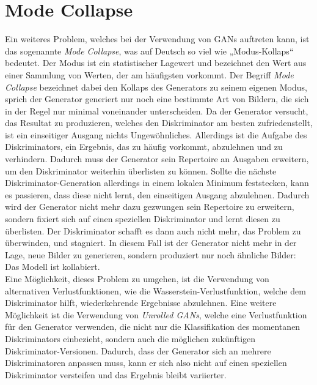 \section{Mode Collapse}

\noindent Ein weiteres Problem, welches bei der Verwendung von \acp{GAN} auftreten kann, ist das sogenannte \textit{Mode Collapse}, was auf Deutsch so viel wie „Modus-Kollaps“ bedeutet. Der Modus ist ein statistischer Lagewert und bezeichnet den Wert aus einer Sammlung von Werten, der am häufigsten vorkommt. Der Begriff \textit{Mode Collapse} bezeichnet dabei den Kollaps des Generators zu seinem eigenen Modus, sprich der Generator generiert nur noch eine bestimmte Art von Bildern, die sich in der Regel nur minimal voneinander unterscheiden.  Da der Generator versucht, das Resultat zu produzieren, welches den Diskriminator am besten zufriedenstellt, ist ein einseitiger Ausgang nichts Ungewöhnliches. Allerdings ist die Aufgabe des Diskriminators, ein Ergebnis, das zu häufig vorkommt, abzulehnen und zu verhindern. Dadurch muss der Generator sein Repertoire an Ausgaben erweitern, um den Diskriminator weiterhin überlisten zu können. Sollte die nächste Diskriminator-Generation allerdings in einem lokalen Minimum feststecken, kann es passieren, dass diese nicht lernt, den einseitigen Ausgang abzulehnen. Dadurch wird der Generator nicht mehr dazu gezwungen sein Repertoire zu erweitern, sondern fixiert sich auf einen speziellen Diskriminator und lernt diesen zu überlisten. Der Diskriminator schafft es dann auch nicht mehr, das Problem zu überwinden, und stagniert. In diesem Fall ist der Generator nicht mehr in der Lage, neue Bilder zu generieren, sondern produziert nur noch ähnliche Bilder: Das Modell ist kollabiert. \\

\noindent Eine Möglichkeit, dieses Problem zu umgehen, ist die Verwendung von alternativen Verlustfunktionen, wie die Wasserstein-Verlustfunktion, welche dem Diskriminator hilft, wiederkehrende Ergebnisse abzulehnen. Eine weitere Möglichkeit ist die Verwendung von \textit{Unrolled GANs}, welche eine Verlustfunktion für den Generator verwenden, die nicht nur die Klassifikation des momentanen Diskriminators einbezieht, sondern auch die möglichen zukünftigen Diskriminator-Versionen. Dadurch, dass der Generator sich an mehrere Diskriminatoren anpassen muss, kann er sich also nicht auf einen speziellen Diskriminator versteifen und das Ergebnis bleibt variierter.  \cite{training}

\newpage

